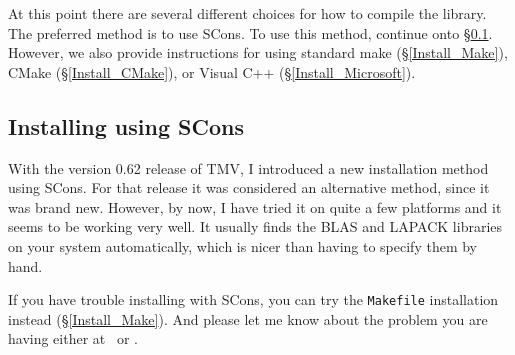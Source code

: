 At this point there are several different choices for how to compile the library.
The preferred method is to use SCons.  To use this method, continue onto \S\ref{Install_SCons}.
However, we also provide instructions for using standard make (\S\ref{Install_Make}),
CMake (\S\ref{Install_CMake}), or Visual C++ (\S\ref{Install_Microsoft}).



\subsection{Installing using SCons}
\label{Install_SCons}

With the version 0.62 release of TMV, I introduced a new installation method using SCons.  
For that 
release it was considered an alternative method, since it was brand new.  However, by now, I
have tried it on quite a few platforms and it seems to be working very well.  It usually finds
the BLAS and LAPACK libraries on your system automatically, which is nicer than having 
to specify them by hand.

If you have trouble installing with SCons, you can try the 
\texttt{Makefile} installation instead (\S\ref{Install_Make}).  And please let me know about 
the problem you are having either at \mygroup\ or \myissues.

